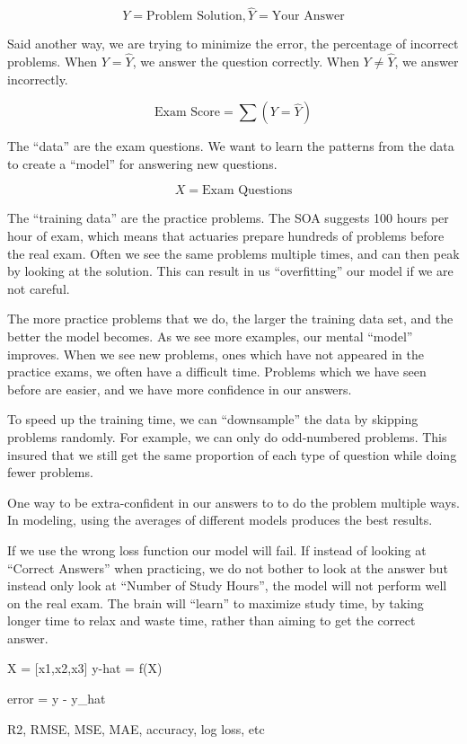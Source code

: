 \documentclass[]{book}
\begin{document}
\[Y = \text{Problem Solution}, \hat{Y} = \text{Your Answer}\]

Said another way, we are trying to minimize the error, the percentage of incorrect problems. When \(Y = \hat{Y}\), we answer the question correctly. When \(Y \neq \hat{Y}\), we answer incorrectly.

\[\text{Exam Score} = \sum{(Y = \hat{Y})}\]

The ``data'' are the exam questions. We want to learn the patterns from the data to create a ``model'' for answering new questions.

\[X = \text{Exam Questions}\]

The ``training data'' are the practice problems. The SOA suggests 100 hours per hour of exam, which means that actuaries prepare hundreds of problems before the real exam. Often we see the same problems multiple times, and can then peak by looking at the solution. This can result in us ``overfitting'' our model if we are not careful.

The more practice problems that we do, the larger the training data set, and the better the model becomes. As we see more examples, our mental ``model'' improves. When we see new problems, ones which have not appeared in the practice exams, we often have a difficult time. Problems which we have seen before are easier, and we have more confidence in our answers.

To speed up the training time, we can ``downsample'' the data by skipping problems randomly. For example, we can only do odd-numbered problems. This insured that we still get the same proportion of each type of question while doing fewer problems.

One way to be extra-confident in our answers to to do the problem multiple ways. In modeling, using the averages of different models produces the best results.

If we use the wrong loss function our model will fail. If instead of looking at ``Correct Answers'' when practicing, we do not bother to look at the answer but instead only look at ``Number of Study Hours'', the model will not perform well on the real exam. The brain will ``learn'' to maximize study time, by taking longer time to relax and waste time, rather than aiming to get the correct answer.

X = {[}x1,x2,x3{]}
y-hat = f(X)

error = y - y\_hat

R2, RMSE, MSE, MAE, accuracy, log loss, etc
\end{document}
